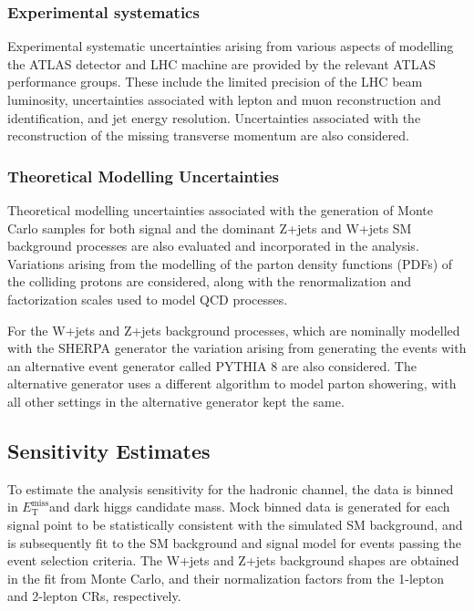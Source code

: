 \documentclass[12pt]{article}
\newcommand*{\met}{\ensuremath{E_\text{T}^\text{miss}}}
\begin{document}
\subsubsection{Experimental systematics}

Experimental systematic uncertainties arising from various aspects of modelling the ATLAS detector and LHC machine are provided by the relevant ATLAS performance groups. These include the limited precision of the LHC beam luminosity, uncertainties associated with lepton and muon reconstruction and identification, and jet energy resolution. Uncertainties associated with the reconstruction of the missing transverse momentum are also considered. 

\subsubsection{Theoretical Modelling Uncertainties}

Theoretical modelling uncertainties associated with the generation of Monte Carlo samples for both signal and the dominant Z+jets and W+jets SM background processes are also evaluated and incorporated in the analysis. Variations arising from the modelling of the parton density functions (PDFs) \cite{PDG_PDF} of the colliding protons are considered, along with the renormalization and factorization scales \cite{PDG_QCD} used to model QCD processes. 

For the W+jets and Z+jets background processes, which are nominally modelled with the SHERPA generator \cite{SHERPA} the variation arising from generating the events with an alternative event generator called PYTHIA 8 \cite{PYTHIA8} are also considered. The alternative generator uses a different algorithm to model parton showering, with all other settings in the alternative generator kept the same. 

\subsection{Sensitivity Estimates}

To estimate the analysis sensitivity for the hadronic channel, the data is binned in \met and dark higgs candidate mass. Mock binned data is generated for each signal point to be statistically consistent with the simulated SM background, and is subsequently fit to the SM background and signal model for events passing the event selection criteria. The W+jets and Z+jets background shapes are obtained in the fit from Monte Carlo, and their normalization factors from the 1-lepton and 2-lepton CRs, respectively. 
\end{document}

